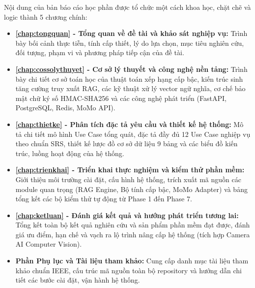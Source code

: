 Nội dung của bản báo cáo học phần được tổ chức một cách khoa học, chặt chẽ và logic thành 5 chương chính:
\begin{itemize}[leftmargin=1.5cm]
    \item \textbf{\cref{chap:tongquan} - Tổng quan về đề tài và khảo sát nghiệp vụ:} Trình bày bối cảnh thực tiễn, tính cấp thiết, lý do lựa chọn, mục tiêu nghiên cứu, đối tượng, phạm vi và phương pháp tiếp cận của đề tài.
    \item \textbf{\cref{chap:cossolythuyet} - Cơ sở lý thuyết và công nghệ nền tảng:} Trình bày chi tiết cơ sở toán học của thuật toán xếp hạng cấp bậc, kiến trúc sinh tăng cường truy xuất RAG, các kỹ thuật xử lý vector ngữ nghĩa, cơ chế bảo mật chữ ký số HMAC-SHA256 và các công nghệ phát triển (FastAPI, PostgreSQL, Redis, MoMo API).
    \item \textbf{\cref{chap:thietke} - Phân tích đặc tả yêu cầu và thiết kế hệ thống:} Mô tả chi tiết mô hình Use Case tổng quát, đặc tả đầy đủ 12 Use Case nghiệp vụ theo chuẩn SRS, thiết kế lược đồ cơ sở dữ liệu 9 bảng và các biểu đồ kiến trúc, luồng hoạt động của hệ thống.
    \item \textbf{\cref{chap:trienkhai} - Triển khai thực nghiệm và kiểm thử phần mềm:} Giới thiệu môi trường cài đặt, cấu hình hệ thống, trích xuất mã nguồn các module quan trọng (RAG Engine, Bộ tính cấp bậc, MoMo Adapter) và bảng tổng kết các bộ kiểm thử tự động từ Phase 1 đến Phase 7.
    \item \textbf{\cref{chap:ketluan} - Đánh giá kết quả và hướng phát triển tương lai:} Tổng kết toàn bộ kết quả nghiên cứu và sản phẩm phần mềm đạt được, đánh giá ưu điểm, hạn chế và vạch ra lộ trình nâng cấp hệ thống (tích hợp Camera AI Computer Vision).
    \item \textbf{Phần Phụ lục và Tài liệu tham khảo:} Cung cấp danh mục tài liệu tham khảo chuẩn IEEE, cấu trúc mã nguồn toàn bộ repository và hướng dẫn chi tiết các bước cài đặt, vận hành hệ thống.
\end{itemize}
